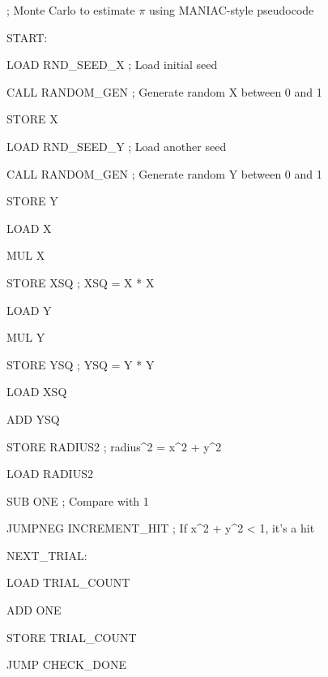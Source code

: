       


\begin{tcolorbox}[title=Monte Carlo Simulation for \(\pi\), colback=gray!5, colframe=black]
  \ttfamily
  
  ; Monte Carlo to estimate $\pi$ using MANIAC-style pseudocode\par
  
  START:\par
  \quad LOAD RND\_SEED\_X         ; Load initial seed\par
  \quad CALL RANDOM\_GEN         ; Generate random X between 0 and 1\par
  \quad STORE X\par
  
  \quad LOAD RND\_SEED\_Y         ; Load another seed\par
  \quad CALL RANDOM\_GEN         ; Generate random Y between 0 and 1\par
  \quad STORE Y\par
  
  \quad LOAD X\par
  \quad MUL X\par
  \quad STORE XSQ               ; XSQ = X * X\par
  
  \quad LOAD Y\par
  \quad MUL Y\par
  \quad STORE YSQ               ; YSQ = Y * Y\par
  
  \quad LOAD XSQ\par
  \quad ADD YSQ\par
  \quad STORE RADIUS2           ; radius\^{}2 = x\^{}2 + y\^{}2\par
  
  \quad LOAD RADIUS2\par
  \quad SUB ONE                 ; Compare with 1\par
  \quad JUMPNEG INCREMENT\_HIT   ; If x\^{}2 + y\^{}2 < 1, it's a hit\par
  
  \end{tcolorbox}

      
  \begin{tcolorbox}[title=Monte Carlo Simulation for \(\pi\), colback=gray!5, colframe=black]
      \ttfamily
      
      
      NEXT\_TRIAL:\par
      \quad LOAD TRIAL\_COUNT\par
      \quad ADD ONE\par
      \quad STORE TRIAL\_COUNT\par
      \quad JUMP CHECK\_DONE\par
      
\end{tcolorbox}

